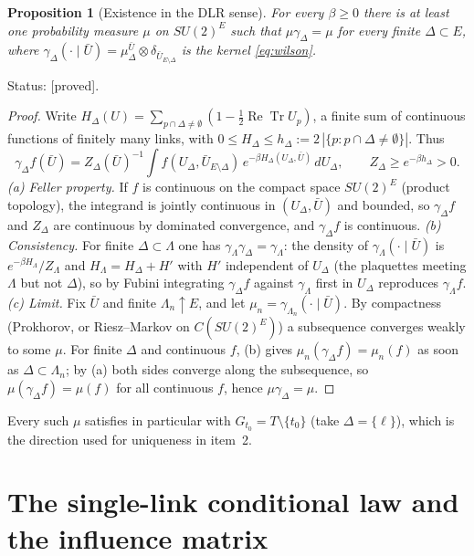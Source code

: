 \documentclass[11pt,a4paper]{article}
\newtheorem{proposition}[theorem]{Proposition}
\theoremstyle{remark}
\theoremstyle{definition}
\theoremstyle{plain}
\theoremstyle{remark}
\newcommand{\ReTr}{\operatorname{Re}\operatorname{Tr}}
\newcommand{\st}[1]{\textsf{[#1]}}
\begin{document}
\begin{proposition}[Existence in the DLR sense]\label{prop:exist}
For every $\beta\ge0$ there is at least one probability measure $\mu$ on $SU(2)^E$ such that
$\mu\gamma_\Delta=\mu$ for every finite $\Delta\subset E$, where $\gamma_\Delta(\cdot\mid\bar U)=
\mu^{\bar U}_\Delta\otimes\delta_{\bar U_{E\setminus\Delta}}$ is the kernel \eqref{eq:wilson}.
\end{proposition}
\noindent Status: \st{proved}.
\begin{proof}
Write $H_\Delta(U)=\sum_{p\cap\Delta\ne\emptyset}(1-\tfrac12\ReTr U_p)$, a finite sum of continuous functions of
finitely many links, with $0\le H_\Delta\le h_\Delta:=2\,|\{p:p\cap\Delta\ne\emptyset\}|$. Thus
\[
\gamma_\Delta f(\bar U)=Z_\Delta(\bar U)^{-1}\int f(U_\Delta,\bar U_{E\setminus\Delta})\,e^{-\beta H_\Delta(U_\Delta,\bar U)}\,dU_\Delta,
\qquad Z_\Delta\ge e^{-\beta h_\Delta}>0 .
\]
\emph{(a) Feller property.} If $f$ is continuous on the compact space $SU(2)^E$ (product topology), the
integrand is jointly continuous in $(U_\Delta,\bar U)$ and bounded, so $\gamma_\Delta f$ and $Z_\Delta$ are
continuous by dominated convergence, and $\gamma_\Delta f$ is continuous.
\emph{(b) Consistency.} For finite $\Delta\subset\Lambda$ one has $\gamma_\Lambda\gamma_\Delta=\gamma_\Lambda$: the density of
$\gamma_\Lambda(\cdot\mid\bar U)$ is $e^{-\beta H_\Lambda}/Z_\Lambda$ and $H_\Lambda=H_\Delta+H'$ with $H'$ independent of
$U_\Delta$ (the plaquettes meeting $\Lambda$ but not $\Delta$), so by Fubini integrating $\gamma_\Delta f$ against
$\gamma_\Lambda$ first in $U_\Delta$ reproduces $\gamma_\Lambda f$.
\emph{(c) Limit.} Fix $\bar U$ and finite $\Lambda_n\uparrow E$, and let $\mu_n=\gamma_{\Lambda_n}(\cdot\mid\bar U)$. By
compactness (Prokhorov, or Riesz--Markov on $C(SU(2)^E)$) a subsequence converges weakly to some $\mu$.
For finite $\Delta$ and continuous $f$, (b) gives $\mu_n(\gamma_\Delta f)=\mu_n(f)$ as soon as
$\Delta\subset\Lambda_n$; by (a) both sides converge along the subsequence, so $\mu(\gamma_\Delta f)=\mu(f)$ for all
continuous $f$, hence $\mu\gamma_\Delta=\mu$.
\end{proof}
Every such $\mu$ satisfies in particular \cite[(1.3)]{Dob70} with $G_{t_0}=T\setminus\{t_0\}$ (take $\Delta=\{\ell\}$),
which is the direction used for uniqueness in item~2.

\section{The single-link conditional law and the influence matrix}\label{sec:influence}
\end{document}
